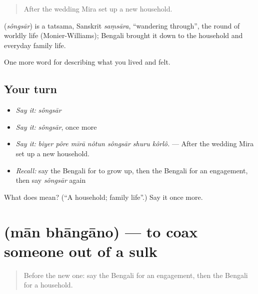 \begin{quote}
After the wedding Mira set up a new household.
\end{quote}

\begin{cousinweb}
\textbf{} (\emph{sôngsār}) is a tatsama, Sanskrit \emph{saṃsāra}, \textquotedblleft{}wandering through\textquotedblright{}, the round of worldly life (Monier-Williams); Bengali brought it down to the household and everyday family life.
\end{cousinweb}

\begin{grammarlens}[title={What you've built}]
One more word for describing what you lived and felt.
\end{grammarlens}

\subsection*{Your turn}
\begin{itemize}
\raggedright
  \item \emph{Say it:} \emph{sôngsār}
  \item \emph{Say it:} \emph{sôngsār}, once more
  \item \emph{Say it:} \emph{biyer pôre mīrā nôtun sôngsār shuru kôrlô.} — After the wedding Mira set up a new household.
  \item \emph{Recall:} say the Bengali for to grow up, then the Bengali for an engagement, then say \emph{sôngsār} again
\end{itemize}

\begin{tcolorbox}[breakable,colback=teal!4,colframe=teal!35!black,title={Before you move on}]
What does  mean? (\textquotedblleft{}A household; family life\textquotedblright{}.) Say it once more.
\end{tcolorbox}
\section[\texorpdfstring{\bn{মান} \bn{ভাঙানো} (mān bhāngāno)}{মান ভাঙানো (mān bhāngāno)}]{  (mān bhāngāno) — to coax someone out of a sulk}

\label{lesson:BN-C489-man-bhangano}



\begin{quote}
Before the new one: say the Bengali for an engagement, then the Bengali for a household.
\end{quote}

